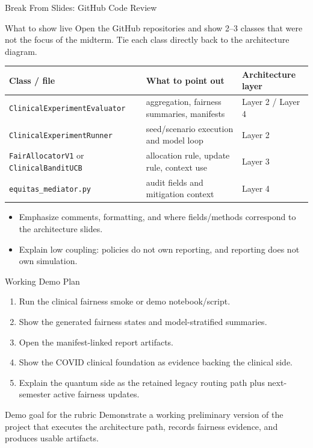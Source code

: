 \begin{frame}{Break From Slides: GitHub Code Review}
\begin{block}{What to show live}
Open the GitHub repositories and show 2--3 classes that were not the focus of the midterm. Tie each class directly back to the architecture diagram.
\end{block}
\small
\begin{tabular}{p{}p{}p{}}
\toprule
Class / file & What to point out & Architecture layer \\
\midrule
\texttt{ClinicalExperimentEvaluator} & aggregation, fairness summaries, manifests & Layer 2 / Layer 4 \\
\texttt{ClinicalExperimentRunner} & seed/scenario execution and model loop & Layer 2 \\
\texttt{FairAllocatorV1} or \texttt{ClinicalBanditUCB} & allocation rule, update rule, context use & Layer 3 \\
\texttt{equitas\_mediator.py} & audit fields and mitigation context & Layer 4 \\
\bottomrule
\end{tabular}
\vspace{0.4em}
\begin{itemize}
\item Emphasize comments, formatting, and where fields/methods correspond to the architecture slides.
\item Explain low coupling: policies do not own reporting, and reporting does not own simulation.
\end{itemize}
\end{frame}

\begin{frame}{Working Demo Plan}
\begin{enumerate}
\item Run the clinical fairness smoke or demo notebook/script.
\item Show the generated fairness states and model-stratified summaries.
\item Open the manifest-linked report artifacts.
\item Show the COVID clinical foundation as evidence backing the clinical side.
\item Explain the quantum side as the retained legacy routing path plus next-semester active fairness updates.
\end{enumerate}
\vspace{0.4em}
\begin{block}{Demo goal for the rubric}
Demonstrate a working preliminary version of the project that executes the architecture path, records fairness evidence, and produces usable artifacts.
\end{block}
\end{frame}

